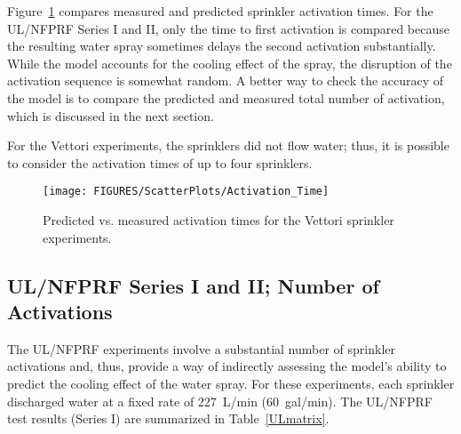 Figure~\ref{Sprinkler_Activation_Times} compares measured and predicted sprinkler activation times. For the UL/NFPRF Series I and II, only the time to first activation is compared because the resulting water spray sometimes delays the second activation substantially. While the model accounts for the cooling effect of the spray, the disruption of the activation sequence is somewhat random. A better way to check the accuracy of the model is to compare the predicted and measured total number of activation, which is discussed in the next section.

For the Vettori experiments, the sprinklers did not flow water; thus, it is possible to consider the activation times of up to four sprinklers.

\begin{figure}[h]
\begin{center}
\texttt{[image: FIGURES/ScatterPlots/Activation\_Time]}
\end{center}
\caption[Activation times for the Vettori sprinkler experiments]{Predicted vs. measured activation times for the Vettori sprinkler experiments.}
\label{Sprinkler_Activation_Times}
\end{figure}


\clearpage

\subsection{UL/NFPRF Series I and II; Number of Activations}
\label{UL_NFPRF:Results}

The UL/NFPRF experiments involve a substantial number of sprinkler activations and, thus, provide a way of indirectly assessing the model's ability to predict the cooling effect of the water spray. For these experiments, each sprinkler discharged water at a fixed rate of 227~L/min (60~gal/min). 
The UL/NFPRF test results (Series I) are summarized in Table~\ref{ULmatrix}.

